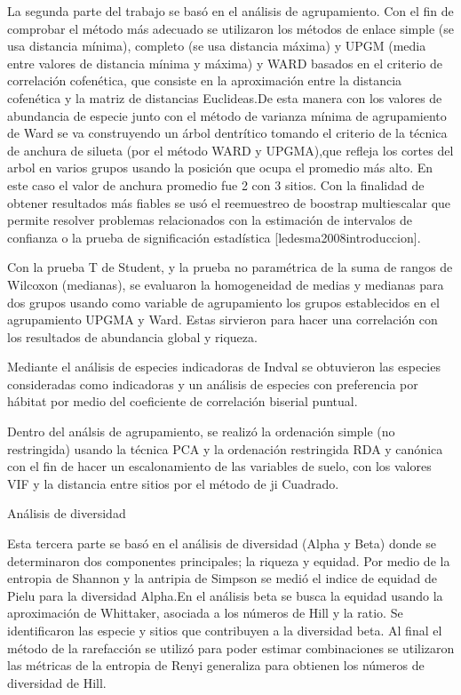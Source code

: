 \documentclass[11pt,]{article}
\begin{document}
La segunda parte del trabajo se basó en el análisis de agrupamiento. Con
el fin de comprobar el método más adecuado se utilizaron los métodos de
enlace simple (se usa distancia mínima), completo (se usa distancia
máxima) y UPGM (media entre valores de distancia mínima y máxima) y WARD
basados en el criterio de correlación cofenética, que consiste en la
aproximación entre la distancia cofenética y la matriz de distancias
Euclideas.De esta manera con los valores de abundancia de especie junto
con el método de varianza mínima de agrupamiento de Ward se va
construyendo un árbol dentrítico tomando el criterio de la técnica de
anchura de silueta (por el método WARD y UPGMA),que refleja los cortes
del arbol en varios grupos usando la posición que ocupa el promedio más
alto. En este caso el valor de anchura promedio fue 2 con 3 sitios. Con
la finalidad de obtener resultados más fiables se usó el reemuestreo de
boostrap multiescalar que permite resolver problemas relacionados con la
estimación de intervalos de confianza o la prueba de significación
estadística {[}ledesma2008introduccion{]}.

Con la prueba T de Student, y la prueba no paramétrica de la suma de
rangos de Wilcoxon (medianas), se evaluaron la homogeneidad de medias y
medianas para dos grupos usando como variable de agrupamiento los grupos
establecidos en el agrupamiento UPGMA y Ward. Estas sirvieron para hacer
una correlación con los resultados de abundancia global y riqueza.

Mediante el análisis de especies indicadoras de Indval se obtuvieron las
especies consideradas como indicadoras y un análisis de especies con
preferencia por hábitat por medio del coeficiente de correlación
biserial puntual.

Dentro del análsis de agrupamiento, se realizó la ordenación simple (no
restringida) usando la técnica PCA y la ordenación restringida RDA y
canónica con el fin de hacer un escalonamiento de las variables de
suelo, con los valores VIF y la distancia entre sitios por el método de
ji Cuadrado.

Análisis de diversidad

Esta tercera parte se basó en el análisis de diversidad (Alpha y Beta)
donde se determinaron dos componentes principales; la riqueza y equidad.
Por medio de la entropia de Shannon y la antripia de Simpson se medió el
indice de equidad de Pielu para la diversidad Alpha.En el análisis beta
se busca la equidad usando la aproximación de Whittaker, asociada a los
números de Hill y la ratio. Se identificaron las especie y sitios que
contribuyen a la diversidad beta. Al final el método de la rarefacción
se utilizó para poder estimar combinaciones se utilizaron las métricas
de la entropia de Renyi generaliza para obtienen los números de
diversidad de Hill.
\end{document}
